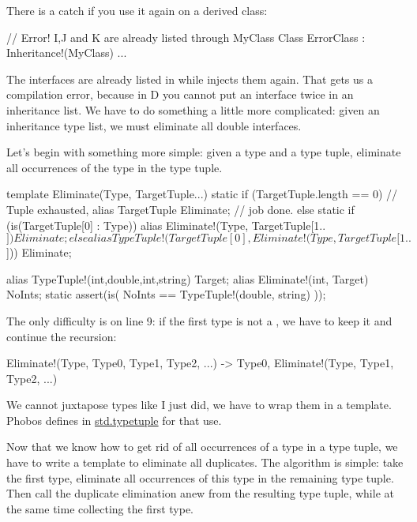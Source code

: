 There is a catch if you use it again on a derived class:

\begin{dcode}
// Error! I,J and K are already listed through MyClass
Class ErrorClass : Inheritance!(MyClass) { ... }
\end{dcode}

The interfaces are already listed in  while  injects them again. That gets us a compilation error, because in D you cannot put an interface twice in an inheritance list. We have to do something a little more complicated: given an inheritance type list, we must eliminate all double interfaces.

Let's begin with something more simple: given a type and a type tuple, eliminate all occurrences of the type in the type tuple.

\begin{dcode}
template Eliminate(Type, TargetTuple...)
{
    static if (TargetTuple.length == 0) // Tuple exhausted,
        alias TargetTuple Eliminate;    // job done.
    else static if (is(TargetTuple[0] : Type))
        alias Eliminate!(Type, TargetTuple[1..$]) Eliminate;
    else
        alias 
TypeTuple!(TargetTuple[0], Eliminate!(Type, TargetTuple[1..$])) Eliminate;
}

alias TypeTuple!(int,double,int,string) Target;
alias Eliminate!(int, Target) NoInts;
static assert(is( NoInts == TypeTuple!(double, string) ));
\end{dcode}

The only difficulty is on line 9: if the first type is not a , we have to keep it and continue the recursion:

\begin{dcode}
Eliminate!(Type,  Type0, Type1, Type2, ...)
->
Type0, Eliminate!(Type,  Type1, Type2, ...)
\end{dcode}

We cannot juxtapose types like I just did, we have to wrap them in a template. Phobos defines  in \href{www.d-programming-language.org/phobos/std_typetuple.html}{std.typetuple} for that use.

Now that we know how to get rid of all occurrences of a type in a type tuple, we have to write a template to eliminate all duplicates. The algorithm is simple: take the first type, eliminate all occurrences of this type in the remaining type tuple. Then call the duplicate elimination anew from the resulting type tuple, while at the same time collecting the first type.

